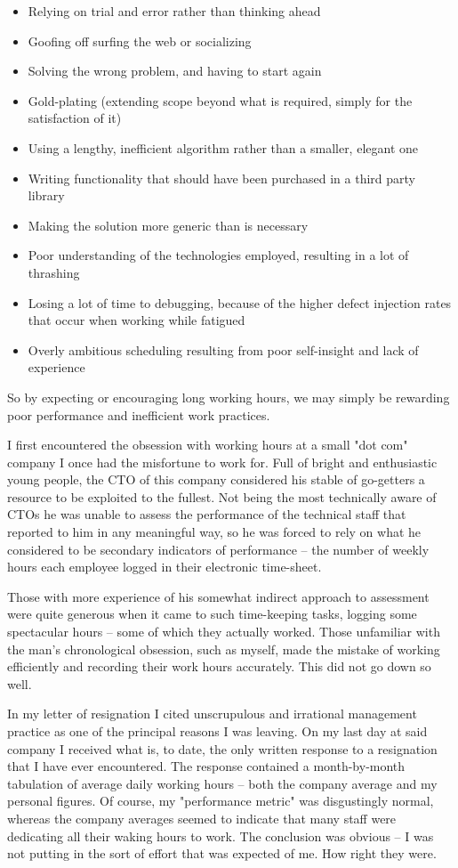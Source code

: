 \documentclass{article}
\begin{document}
\begin{enumerate}
\begin{enumerate}
\begin{itemize}
\item Relying on trial and error rather than thinking ahead
\item Goofing off surfing the web or socializing
\item Solving the wrong problem, and having to start again
\item Gold-plating (extending scope beyond what is required, simply for the
satisfaction of it)
\item Using a lengthy, inefficient algorithm rather than a smaller, elegant
one
\item Writing functionality that should have been purchased in a third
party library
\item Making the solution more generic than is necessary
\item Poor understanding of the technologies employed, resulting in a lot
of thrashing
\item Losing a lot of time to debugging, because of the higher defect
injection rates that occur when working while fatigued
\item Overly ambitious scheduling resulting from poor self-insight and lack
of experience
\end{itemize}

So by expecting or encouraging long working hours, we may simply be
rewarding poor performance and inefficient work practices.

I first encountered the obsession with working hours at a small "dot
com" company I once had the misfortune to work for. Full of bright and
enthusiastic young people, the CTO of this company considered his stable
of go-getters a resource to be exploited to the fullest. Not being the
most technically aware of CTOs he was unable to assess the performance
of the technical staff that reported to him in any meaningful way, so he
was forced to rely on what he considered to be secondary indicators of
performance -- the number of weekly hours each employee logged in their
electronic time-sheet.

Those with more experience of his somewhat indirect approach to
assessment were quite generous when it came to such time-keeping tasks,
logging some spectacular hours -- some of which they actually worked.
Those unfamiliar with the man's chronological obsession, such as myself,
made the mistake of working efficiently and recording their work hours
accurately. This did not go down so well.

In my letter of resignation I cited unscrupulous and irrational
management practice as one of the principal reasons I was leaving. On my
last day at said company I received what is, to date, the only written
response to a resignation that I have ever encountered. The response
contained a month-by-month tabulation of average daily working hours --
both the company average and my personal figures. Of course, my
"performance metric" was disgustingly normal, whereas the company
averages seemed to indicate that many staff were dedicating all their
waking hours to work. The conclusion was obvious -- I was not putting in
the sort of effort that was expected of me. How right they were.


\end{enumerate}
\end{enumerate}
\end{document}
